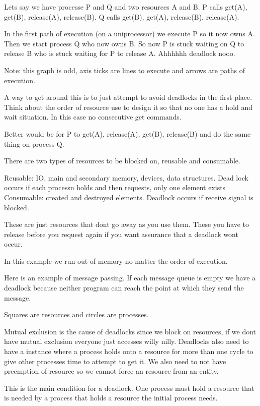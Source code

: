 \documentclass[24pt]{article}
\begin{document}



Lets say we have processe P and Q and two resources A and B. P calls get(A), get(B), release(A), release(B). Q calls get(B), get(A), release(B), release(A).

In the first path of execution (on a uniprocessor) we execute P so it now owns A. Then we start process Q who now owns B. So now P is stuck waiting on Q to release B who is stuck waiting for P to release A. Ahhhhhh deadlock nooo.

Note: this graph is odd, axis ticks are lines to execute and arrows are paths of execution.


A way to get around this is to just attempt to avoid deadlocks in the first place. Think about the order of resource use to design it so that no one has a hold and wait situation. In this case no consecutive get commands.

Better would be for P to get(A), release(A), get(B), release(B) and do the same thing on process Q.

There are two types of resources to be blocked on, reusable and consumable.

Reusable: IO, main and secondary memory, devices, data structures. Dead lock occurs if each processn holds and then requests, only one element exists
Consumable: created and destroyed elements. Deadlock occurs if receive signal is blocked.

These are just resources that dont go away as you use them. These you have to release before you request again if you want assurance that a deadlock wont occur.


In this example we run out of memory no matter the order of execution.

Here is an example of message passing. If each message queue is empty we have a deadlock because neither program can reach the point at which they send the message.

Squares are resources and circles are processes.

Mutual exclusion is the cause of deadlocks since we block on resources, if we dont have mutual exclusion everyone just accesses willy nilly. Deadlocks also need to have a instance where a process holds onto a resource for more than one cycle to give other processes time to attempt to get it. We also need to not have preemption of resource so we cannot force an resource from an entity.

This is the main condition for a deadlock. One process must hold a resource that is needed by a process that holds a resource the initial process needs.
\end{document}
